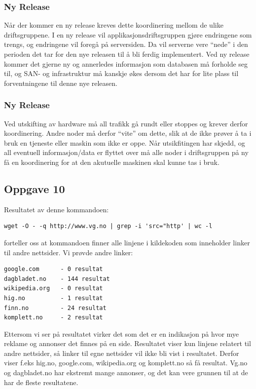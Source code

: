 \documentclass[a4paper, norsk, 12pt]{article}
\begin{document}
\subsubsection*{Ny Release}
Når der kommer en ny release kreves dette koordinering mellom de ulike driftsgruppene. I en ny release vil applikasjonsdriftsgruppen gjøre endringene som trengs, og endringene vil foregå på serversiden. Da vil serverne vere “nede” i den perioden det tar for den nye releasen til å bli ferdig implementert. Ved ny release kommer det gjerne ny og annerledes informasjon som databasen må forholde seg til, og SAN- og infrastruktur må kanskje økes dersom det har for lite plass til forventningene til denne nye releasen.

\subsubsection*{Ny Release}
Ved utskifting av hardware må all trafikk gå rundt eller stoppes og krever derfor koordinering. Andre noder må derfor “vite” om dette, slik at de ikke prøver å ta i bruk en tjeneste eller maskin som ikke er oppe. Når utsikfitingen har skjedd, og all eventuell informasjon/data er flyttet over må alle noder i driftsgruppen på ny få en koordinering for at den akutuelle maskinen skal kunne tas i bruk.

\subsection{Oppgave 10}
Resultatet av denne kommandoen:
\begin{verbatim}
wget -O - -q http://www.vg.no | grep -i 'src="http' | wc -l
\end{verbatim}
forteller oss at kommandoen finner alle linjene i kildekoden som inneholder linker til andre nettsider.
Vi prøvde andre linker:
\begin{verbatim}
google.com      - 0 resultat
dagbladet.no    - 144 resultat
wikipedia.org   - 0 resultat
hig.no          - 1 resultat
finn.no         - 24 resultat
komplett.no     - 2 resultat
\end{verbatim}

Ettersom vi ser på resultatet virker det som det er en indikasjon på hvor mye reklame og annonser det finnes på en side. Resultatet viser kun linjene relatert til andre nettsider, så linker til egne nettsider vil ikke bli vist i resultatet. Derfor viser f.eks hig.no, google.com, wikipedia.org og komplett.no så få resultat. Vg.no og dagbladet.no har ekstremt mange annonser, og det kan vere grunnen til at de har de fleste resultatene.
\end{document}
